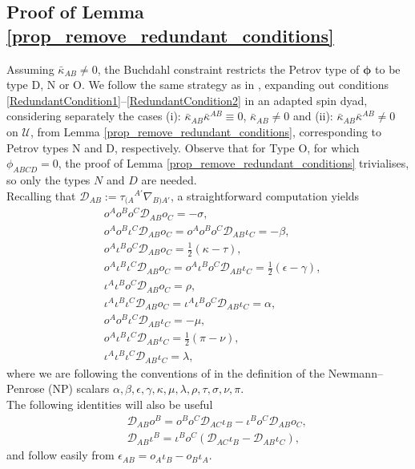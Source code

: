 \documentclass[10pt,a4paper]{article}
\theoremstyle{plain}
\begin{document}
\subsection{Proof of Lemma \ref{prop_remove_redundant_conditions}}
\label{Sec:ProofOfProp3}


Assuming $\bar{\kappa}_{AB}\neq 0$, the Buchdahl constraint restricts
the Petrov type of $\bm\phi$ to be type D, N or O.  We follow the same
strategy as in \cite{BaeVal10c}, expanding out conditions
\eqref{RedundantCondition1}--\eqref{RedundantCondition2} in an adapted
spin dyad, considering separately the cases (i):
$\bar{\kappa}_{AB}\bar{\kappa}^{AB}\equiv 0$, $\bar{\kappa}_{AB}\neq
0$ and (ii): $\bar{\kappa}_{AB}\bar{\kappa}^{AB}\neq 0$ on
$\mathcal{U}$, from Lemma \ref{prop_remove_redundant_conditions},
corresponding to Petrov types N and D, respectively.  Observe that for
Type O, for which $\phi_{ABCD}=0$, the proof of Lemma
\ref{prop_remove_redundant_conditions} trivialises, so only the types
$N$ and $D$ are needed.  \\

Recalling that $\mathcal{D}_{AB}:= \tau_{(A}{}^{A'}\nabla_{B)A'}$, a straightforward computation yields 
\begin{align*}
& o^Ao^Bo^C\mathcal{D}_{AB}o_C = -\sigma,\\
& o^Ao^B\iota^C\mathcal{D}_{AB}o_C=o^Ao^Bo^C\mathcal{D}_{AB}\iota_C=-\beta,\\
& o^A\iota^B o^C\mathcal{D}_{AB}o_C = \tfrac{1}{2}(\kappa - \tau),\\
& o^A\iota^B\iota^C\mathcal{D}_{AB}o_C = o^A\iota^B o^C\mathcal{D}_{AB}\iota_C = \tfrac{1}{2}(\epsilon - \gamma),\\
& \iota^A\iota^B o^C\mathcal{D}_{AB}o_C = \rho,\\
& \iota^A\iota^B\iota^C\mathcal{D}_{AB}o_C = \iota^A\iota^B o^C\mathcal{D}_{AB}\iota_C = \alpha,\\
& o^A o^B\iota^C\mathcal{D}_{AB}\iota_C = -\mu,\\
& o^A\iota^B\iota^C\mathcal{D}_{AB}\iota_C = \tfrac{1}{2}(\pi - \nu),\\
& \iota^A\iota^B\iota^C\mathcal{D}_{AB}\iota_C = \lambda	,
\end{align*}
where we are following the conventions of \cite{PenRin84} in the
definition of the Newmann--Penrose (NP) scalars $\alpha, \beta,
\epsilon, \gamma, \kappa, \mu, \lambda, \rho, \tau, \sigma, \nu, \pi.$
\\

The following identities will also be useful
\begin{subequations}
\begin{eqnarray}
&& \mathcal{D}_{AB}o^B = o^Bo^C\mathcal{D}_{AC}\iota_B - \iota^B o^C\mathcal{D}_{AB}o_C,\\
&& \mathcal{D}_{AB}\iota^B = \iota^B o^C(\mathcal{D}_{AC}\iota_B - \mathcal{D}_{AB}\iota_C),
\end{eqnarray}
\end{subequations}
and follow easily from $\epsilon_{AB}=o_A\iota_B - o_B\iota_A$. 
\end{document}
